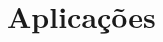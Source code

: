 \documentclass[../main]{subfiles}
\begin{document}
    \chapter{Aplicações}\label{chapter:aplicacoes}

    
\end{document}
